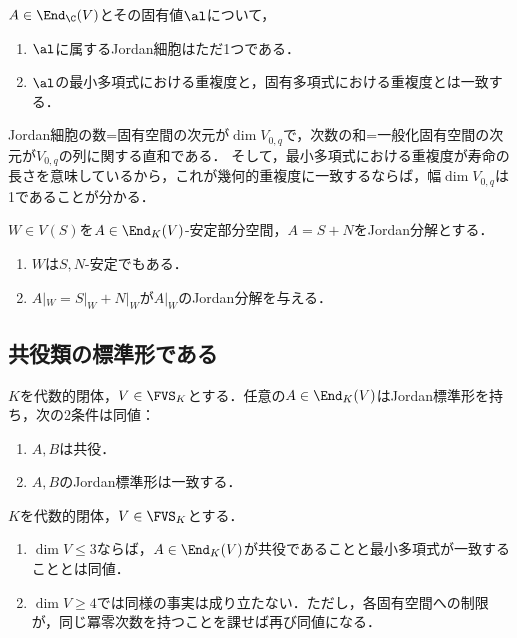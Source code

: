 \documentclass[uplatex, dvipdfmx]{jsreport}
\begin{document}
\begin{corollary}
    $A\in\End_\C(V)$とその固有値$\al$について，
    \begin{enumerate}
        \item $\al$に属するJordan細胞はただ1つである．
        \item $\al$の最小多項式における重複度と，固有多項式における重複度とは一致する．
    \end{enumerate}
\end{corollary}
\begin{remarks}
    Jordan細胞の数=固有空間の次元が$\dim V_{0,q}$で，次数の和=一般化固有空間の次元が$V_{0,q}$の列に関する直和である．
    そして，最小多項式における重複度が寿命の長さを意味しているから，これが幾何的重複度に一致するならば，幅$\dim V_{0,q}$は1であることが分かる．
\end{remarks}

\begin{corollary}[Jordan分解の遺伝]
    $W\in V(S)$を$A\in\End_K(V)$-安定部分空間，$A=S+N$をJordan分解とする．
    \begin{enumerate}
        \item $W$は$S,N$-安定でもある．
        \item $A|_W=S|_W+N|_W$が$A|_W$のJordan分解を与える．
    \end{enumerate}
\end{corollary}

\subsection{共役類の標準形である}

\begin{theorem}[Jordan標準形は共役類不変量である]
    $K$を代数的閉体，$V\in\FVS_K$とする．任意の$A\in\End_K(V)$はJordan標準形を持ち，次の2条件は同値：
    \begin{enumerate}
        \item $A,B$は共役．
        \item $A,B$のJordan標準形は一致する．
    \end{enumerate}
\end{theorem}

\begin{proposition}[一般化固有空間分解とそこでの冪零次数が共役不変量である]
    $K$を代数的閉体，$V\in\FVS_K$とする．
    \begin{enumerate}
        \item $\dim V\le3$ならば，$A\in\End_K(V)$が共役であることと最小多項式が一致することとは同値．
        \item $\dim V\ge4$では同様の事実は成り立たない．ただし，各固有空間への制限が，同じ冪零次数を持つことを課せば再び同値になる．
    \end{enumerate}
\end{proposition}
\end{document}
